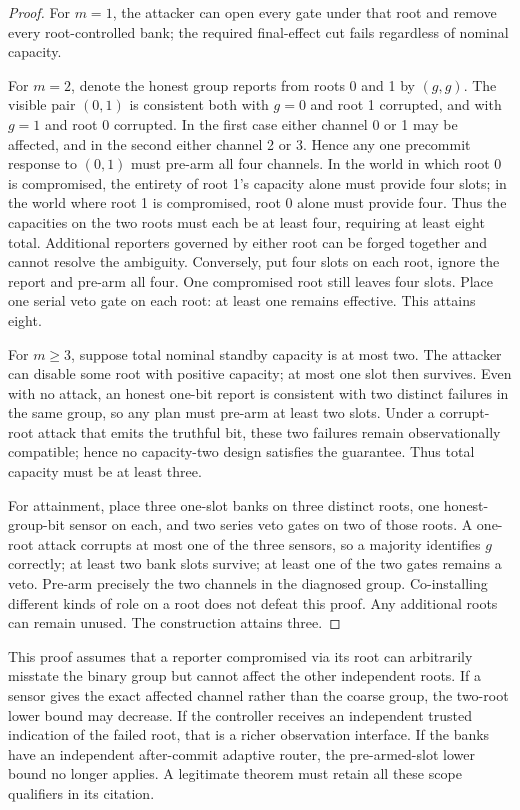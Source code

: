 \documentclass[11pt,a4paper]{article}
\theoremstyle{definition}\newtheorem{definition}{Definition}
\begin{document}
\begin{proof}
For $m=1$, the attacker can open every gate under that root and remove every root-controlled bank; the required final-effect cut fails regardless of nominal capacity.

For $m=2$, denote the honest group reports from roots 0 and 1 by $(g,g)$. The visible pair $(0,1)$ is consistent both with $g=0$ and root 1 corrupted, and with $g=1$ and root 0 corrupted. In the first case either channel 0 or 1 may be affected, and in the second either channel 2 or 3. Hence any one precommit response to $(0,1)$ must pre-arm all four channels. In the world in which root 0 is compromised, the entirety of root 1's capacity alone must provide four slots; in the world where root 1 is compromised, root 0 alone must provide four. Thus the capacities on the two roots must each be at least four, requiring at least eight total. Additional reporters governed by either root can be forged together and cannot resolve the ambiguity. Conversely, put four slots on each root, ignore the report and pre-arm all four. One compromised root still leaves four slots. Place one serial veto gate on each root: at least one remains effective. This attains eight.

For $m\ge3$, suppose total nominal standby capacity is at most two. The attacker can disable some root with positive capacity; at most one slot then survives. Even with no attack, an honest one-bit report is consistent with two distinct failures in the same group, so any plan must pre-arm at least two slots. Under a corrupt-root attack that emits the truthful bit, these two failures remain observationally compatible; hence no capacity-two design satisfies the guarantee. Thus total capacity must be at least three.

For attainment, place three one-slot banks on three distinct roots, one honest-group-bit sensor on each, and two series veto gates on two of those roots. A one-root attack corrupts at most one of the three sensors, so a majority identifies $g$ correctly; at least two bank slots survive; at least one of the two gates remains a veto. Pre-arm precisely the two channels in the diagnosed group. Co-installing different kinds of role on a root does not defeat this proof. Any additional roots can remain unused. The construction attains three.
\end{proof}
This proof assumes that a reporter compromised via its root can arbitrarily misstate the binary group but cannot affect the other independent roots. If a sensor gives the exact affected channel rather than the coarse group, the two-root lower bound may decrease. If the controller receives an independent trusted indication of the failed root, that is a richer observation interface. If the banks have an independent after-commit adaptive router, the pre-armed-slot lower bound no longer applies. A legitimate theorem must retain all these scope qualifiers in its citation.
\end{document}
